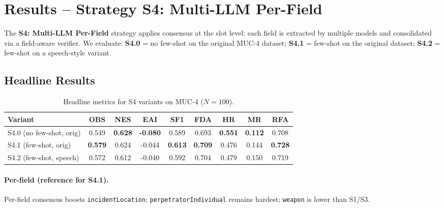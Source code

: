 \section{Results – Strategy S4: Multi-LLM Per-Field}
\label{sec:eval-s4}

The \textbf{S4: Multi-LLM Per-Field} strategy applies consensus at the slot level: each field is extracted by multiple models and consolidated via a field-aware verifier. We evaluate:
\textbf{S4.0} = no few-shot on the original MUC-4 dataset;
\textbf{S4.1} = few-shot on the original dataset;
\textbf{S4.2} = few-shot on a speech-style variant.

\subsection*{Headline Results}

\begin{table}[h]
    \centering
    \caption{Headline metrics for S4 variants on MUC-4 ($N{=}100$).}
    \label{tab:s4-variants-headline}
    \begin{tabular}{lcccccccc}
        \toprule
        Variant & OBS & NES & EAI & SF1 & FDA & HR & MR & RFA \\
        \midrule
        S4.0 (no few-shot, orig) & 0.549 & \textbf{0.628} & \textbf{-0.080} & 0.589 & 0.693 & \textbf{0.551} & \textbf{0.112} & 0.708 \\
        S4.1 (few-shot, orig)    & \textbf{0.579} & 0.624 & -0.044 & \textbf{0.613} & \textbf{0.709} & 0.476 & 0.144 & \textbf{0.728} \\
        S4.2 (few-shot, speech)  & 0.572 & 0.612 & -0.040 & 0.592 & 0.704 & 0.479 & 0.150 & 0.719 \\
        \bottomrule
    \end{tabular}
\end{table}

\paragraph{Per-field (reference for S4.1).}
Per-field consensus boosts \texttt{incidentLocation}; \texttt{perpetratorIndividual} remains hardest; \texttt{weapon} is lower than S1/S3.

